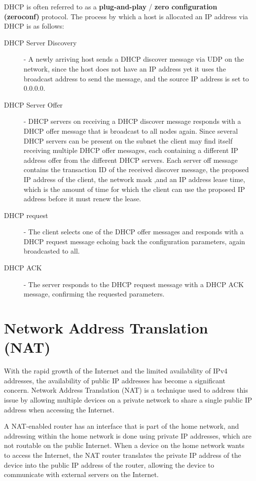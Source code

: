 \documentclass[12pt letter]{report}
\begin{document}
DHCP is often referred to as a \textbf{plug-and-play} / \textbf{zero
configuration (zeroconf)} protocol. The process by which a host is
allocated an IP address via DHCP is as follows:
\begin{description}
  \item[DHCP Server Discovery]  - A newly arriving host sends a DHCP
    discover message via UDP on the network, since the host does not
    have an IP address yet it uses the broadcast address to send the
    message, and the source IP address is set to 0.0.0.0.
  \item[DHCP Server Offer] - DHCP servers on receiving a DHCP
    discover message responds with a DHCP offer message that is broadcast
    to all nodes again. Since several DHCP servers can be present on
    the subnet the client may find itself receiving multiple DHCP
    offer messages, each containing a different IP address offer from
    the different DHCP servers. Each server off message contains the
    transaction ID of the received discover message, the proposed IP
    address of the client, the network mask ,and an IP address lease
    time, which is the amount of time for which the client can use
    the proposed IP address before it must renew the lease.
  \item[DHCP request] - The client selects one of the DHCP offer
    messages and responds with a DHCP request message echoing back
    the configuration parameters, again broadcasted to all.
  \item[DHCP ACK] - The server responds to the DHCP request message
    with a DHCP ACK message, confirming the requested parameters.
\end{description}

\section{Network Address Translation (NAT)}

With the rapid growth of the Internet and the limited availability of
IPv4 addresses, the availability of public IP addresses has become a
significant concern. Network Address Translation (NAT) is a technique
used to address this issue by allowing multiple devices on a private
network to share a single public IP address when accessing the Internet.

A NAT-enabled router has an interface that is part of the home
network, and addressing within the home network is done using private
IP addresses, which are not routable on the public Internet. When a
device on the home network wants to access the Internet, the NAT
router translates the private IP address of the device into the
public IP address of the router, allowing the device to communicate
with external servers on the Internet.
\end{document}
